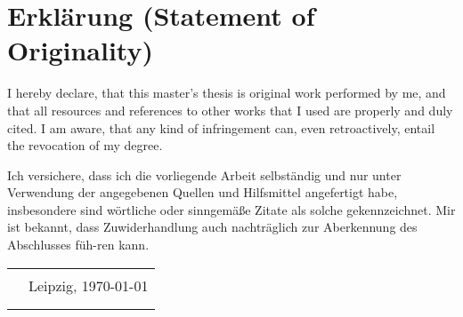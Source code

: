 \section*{Erklärung (Statement of Originality)}\label{erklaerung}

I hereby declare, that this master's thesis is original work performed by me, and that all resources and references to other works that I used are properly and duly cited. I am aware, that any kind of infringement can, even retroactively, entail the revocation of my degree.
\medskip

Ich versichere, dass ich die vorliegende Arbeit selbständig und nur
unter Verwendung der angegebenen Quellen und Hilfsmittel angefertigt
habe, insbesondere sind wörtliche oder sinngemäße Zitate als solche
gekennzeichnet. Mir ist bekannt, dass Zuwiderhandlung auch nachträglich
zur Aberkennung des Abschlusses füh-ren kann.\vspace{3em}

\begin{tabular}{c l}
    \rule{.4\textwidth}{.4pt} & Leipzig, \germanDate{}\today{} \\
    {\footnotesize\documentAuthor{}}       &
\end{tabular}